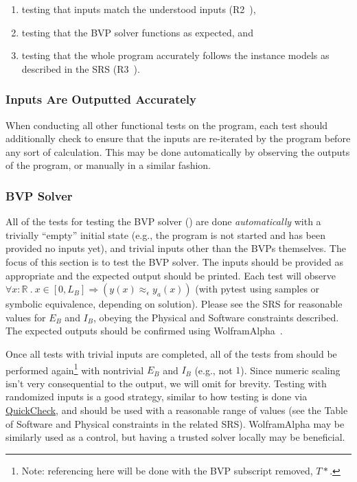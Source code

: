 \documentclass[12pt, titlepage]{article}
\begin{document}
\begin{enumerate}

    \item testing that inputs match the understood inputs
          (R2~\cite{BalaciBeamBendingSRS2023}),

    \item testing that the BVP solver functions as expected, and

    \item testing that the whole program accurately follows the instance models
          as described in the SRS (R3~\cite{BalaciBeamBendingSRS2023}).

\end{enumerate}

\subsubsection{Inputs Are Outputted Accurately}

When conducting all other functional tests on the program, each test should
additionally check to ensure that the inputs are re-iterated by the program
before any sort of calculation. This may be done automatically by observing the
outputs of the program, or manually in a similar fashion.

\subsubsection{BVP Solver}

All of the tests for testing the BVP solver ()
are done \textit{automatically} with a trivially ``empty'' initial state (e.g.,
the program is not started and has been provided no inputs yet), and trivial
inputs other than the BVPs themselves. The focus of this section is to test the
BVP solver. The inputs should be provided as appropriate and the expected output
should be printed. Each test will observe \(\forall x : \mathbb{R} ~.~x \in [0,
    L_B] \Rightarrow (y(x) \approx_{\epsilon} y_a(x))\) (with pytest using samples
or symbolic equivalence, depending on solution). Please see the SRS for
reasonable values for $E_B$ and $I_B$, obeying the Physical and Software
constraints described. The expected outputs should be confirmed using
WolframAlpha~\cite{WolframAlpha}.

Once all tests with trivial inputs are completed, all of the tests from
 should be performed again\footnote{Note:
    referencing here will be done with the BVP subscript removed, $T*$.} with
nontrivial $E_B$ and $I_B$ (e.g., not $1$). Since numeric scaling isn't very
consequential to the output, we will omit for brevity. Testing with randomized
inputs is a good strategy, similar to how testing is done via
\href{https://hackage.haskell.org/package/QuickCheck}{QuickCheck}, and should be
used with a reasonable range of values (see the Table of Software and Physical
constraints in the related SRS). WolframAlpha may be similarly used as a
control, but having a trusted solver locally may be beneficial.
\end{document}
